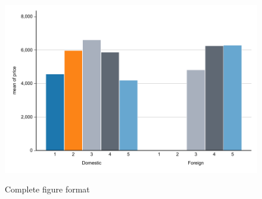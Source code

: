 \documentclass{article}%
\begin{document}
\begin{figure}[p]%
    \caption{Complete figure format}%
    \includegraphics[width=1\textwidth]{figure1.pdf}%
    \label{fig:placements_p}%
\end{figure}

\blindtext
\end{document}
